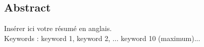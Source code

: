 \begin{vcenterpage}

\chapter*{Abstract}
\adjustmtc
{}

Insérer ici votre résumé en anglais.\\


Keywords : keyword 1, keyword 2, ... keyword 10 (maximum)...


\end{vcenterpage}